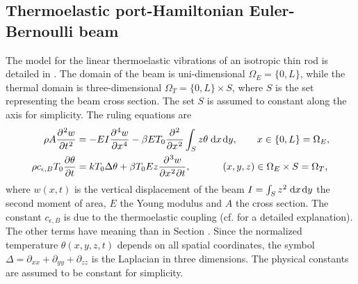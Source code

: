 \subsection{Thermoelastic port-Hamiltonian Euler-Bernoulli beam}
The model for the linear thermoelastic vibrations of an isotropic thin rod is detailed in  \cite{chadwick1962propagation,lifshitz2000thermoelastic}. The domain of the beam is uni-dimensional $\Omega_E = \{0, L\}$, while the thermal domain is three-dimensional $\Omega_T = \{0, L\} \times S$, where $S$ is the set representing the beam cross section. The set $S$ is assumed to constant along the axis for simplicity. The ruling equations are  
\begin{equation}\label{eq:heatbeam}
\begin{aligned}
\rho A \diffp[2]{w}{t} &= - EI \diffp[4]{w}{x} - \beta E T_0 \diffp[2]{}{x} \int_{S} z \theta \d{x}\d{y}, \qquad x \in \{0, L\}=\Omega_E, \\
\rho c_{\epsilon, B} T_0 \diffp{\theta}{t} &= k T_0 \Delta \theta + \beta T_0 E z \diffp[2,1]{w}{x,t}, \qquad \quad\;  (x, y, z) \in \Omega_E \times S = \Omega_T,
\end{aligned} 
\end{equation}
where $w(x,t)$ is the vertical displacement of the beam $I = \int_S z^2 \d{x}\d{y}$ the second moment of area, $E$ the Young modulus and $A$ the cross section. The constant $c_{\epsilon, B}$ is due to the thermoelastic coupling (cf. \cite{chadwick1962propagation,lifshitz2000thermoelastic} for a detailed explanation).  The other terms have meaning than in Section . Since the normalized temperature $\theta(x,y,z,t)$ depends on all spatial coordinates, the symbol $\Delta = \partial_{xx} + \partial_{yy} + \partial_{zz}$ is the Laplacian in three dimensions. The physical constants are assumed to be constant for simplicity.

